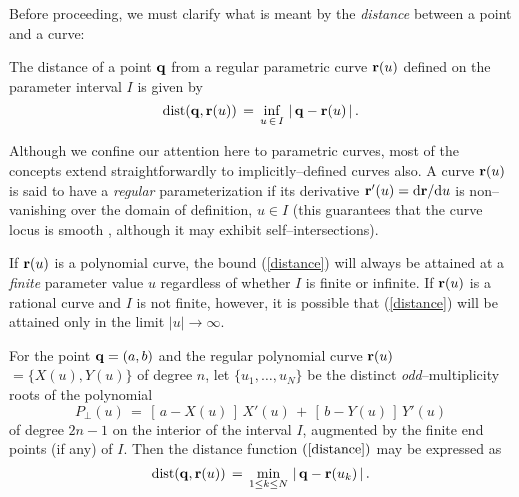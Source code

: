 Before proceeding, we must clarify what is meant by the
{\it distance\/} between a point and a curve:

\begin{dfn}
The distance of a point ${\bf q}$ from a regular parametric
curve ${\bf r}(u)$ defined on the parameter interval $I$ is
given by
\begin{equation} \label{distance}
{\rm dist}({\bf q},{\bf r}(u)) \,=\,
\inf_{u \,\in\, I} \, |\,{\bf q}-{\bf r}(u)\,| \,.
\end{equation}
\end{dfn}

Although we confine our attention here to parametric curves, most
of the concepts extend straightforwardly to implicitly--defined
curves also. A curve ${\bf r}(u)$ is said to have a {\it regular\/}
parameterization if its derivative ${\bf r}'(u)={\rm d}{\bf r}/{\rm d} u$
is non--vanishing over the domain of definition, $u \in I$ (this
guarantees that the curve locus is smooth \cite{farouki92},
although it may exhibit self--intersections).

If ${\bf r}(u)$ is a polynomial curve, the bound (\ref{distance})
will always be attained at a {\it finite\/} parameter value $u$
regardless of whether $I$ is finite or infinite. If ${\bf r}(u)$
is a rational curve and $I$ is not finite, however, it is possible
that (\ref{distance}) will be attained only in the limit $|u|\to
\infty$.

\begin{rmk} \label{polydist} {\rm
For the point ${\bf q}=(a,b)$ and the regular polynomial curve
${\bf r}(u)$ $=\{X(u),Y(u)\}$ of degree $n$, let $\{u_1,\ldots,u_N\}$
be the distinct {\it odd}--multiplicity roots of the polynomial
\begin{equation} \label{Pperp}
P_\perp(u) \,=\,
[\,a-X(u)\,]\,X'(u) \,+\, [\,b-Y(u)\,]\,Y'(u)
\end{equation}
of degree $2n-1$ on the interior of the interval $I$, augmented by
the finite end points (if any) of $I$. Then the distance function
$(\ref{distance})$ may be expressed as
\begin{equation} \label{distance2}
{\rm dist}({\bf q},{\bf r}(u)) \,=\,
\min_{1 \le k \le N} \, |\,{\bf q}-{\bf r}(u_k)\,| \,.
\end{equation}
} \end{rmk}

